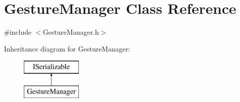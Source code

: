 \hypertarget{class_gesture_manager}{}\section{Gesture\+Manager Class Reference}
\label{class_gesture_manager}


{\ttfamily \#include $<$Gesture\+Manager.\+h$>$}

Inheritance diagram for Gesture\+Manager\+:\begin{figure}[H]
\begin{center}
\leavevmode
\includegraphics[height=2.000000cm]{class_gesture_manager}
\end{center}
\end{figure}
